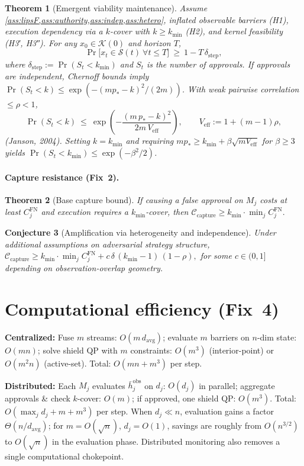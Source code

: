 \documentclass[11pt]{article}
\newtheorem{theorem}{Theorem}[section]
\newtheorem{conjecture}[theorem]{Conjecture}
\theoremstyle{definition}
\newcommand{\K}{\mathcal{K}}
\newcommand{\Sset}{\mathcal{S}}
\newcommand{\1}{\mathbf{1}}
\begin{document}
\begin{theorem}[Emergent viability maintenance]
\label{thm:emergence}
Assume \cref{ass:lipsF,ass:authority,ass:indep,ass:hetero}, inflated observable barriers (H1), execution dependency via a $k$-cover with $k\ge k_{\min}$ (H2), and kernel feasibility (H3′, H3″). For any $x_0\in \K(0)$ and horizon $T$,
\[
\Pr\big[x_t\in \Sset(t)\ \forall t\le T\big]\ \ge\ 1 - T\,\delta_{\mathrm{step}},
\]
where $\delta_{\mathrm{step}}:=\Pr(S_t<k_{\min})$ and $S_t$ is the number of approvals. If approvals are independent, Chernoff bounds imply
$\Pr(S_t<k)\le \exp(-(mp_\ast-k)^2/(2m))$. With weak pairwise correlation $\le \rho<1$,
\[
\Pr(S_t<k)\ \le\ \exp\!\left(-\frac{(m\,p_\ast-k)^2}{2m\,V_{\mathrm{eff}}}\right),\qquad
V_{\mathrm{eff}}:=1+(m-1)\rho,
\]
(Janson, 2004). Setting $k=k_{\min}$ and requiring $mp_\ast \ge k_{\min} + \beta\sqrt{mV_{\mathrm{eff}}}$ for $\beta\ge 3$ yields $\Pr(S_t<k_{\min})\le \exp(-\beta^2/2)$.
\end{theorem}

\paragraph{Capture resistance (Fix~2).}
\begin{theorem}[Base capture bound]
\label{thm:captureBase}
If causing a false approval on $M_j$ costs at least $C_j^{\mathrm{FN}}$ and execution requires a $k_{\min}$-cover, then
\(
\mathcal C_{\mathrm{capture}} \ge k_{\min}\cdot \min_j C_j^{\mathrm{FN}}.
\)
\end{theorem}

\begin{conjecture}[Amplification via heterogeneity and independence]
\label{conj:amplify}
Under additional assumptions on adversarial strategy structure,
\(
\mathcal C_{\mathrm{capture}} \ge k_{\min}\cdot \min_j C_j^{\mathrm{FN}} + c\,\delta\,(k_{\min}-1)\,(1-\rho),
\)
for some $c\in(0,1]$ depending on observation-overlap geometry.
\end{conjecture}

\section{Computational efficiency (Fix~4)}
\textbf{Centralized:}
Fuse $m$ streams: $O(m\,d_{\mathrm{avg}})$; evaluate $m$ barriers on $n$-dim state: $O(mn)$; solve shield QP with $m$ constraints: $O(m^3)$ (interior-point) or $O(m^2 n)$ (active-set).
Total: $O(mn+m^3)$ per step.

\textbf{Distributed:}
Each $M_j$ evaluates $\bar h^{\mathrm{obs}}_j$ on $d_j$: $O(d_j)$ in parallel; aggregate approvals \& check $k$-cover: $O(m)$; if approved, one shield QP: $O(m^3)$.
Total: $O(\max_j d_j + m + m^3)$ per step.
When $d_j\ll n$, evaluation gains a factor $\Theta(n/d_{\mathrm{avg}})$; for $m=O(\sqrt n)$, $d_j=O(1)$, savings are roughly from $O(n^{3/2})$ to $O(\sqrt n)$ in the evaluation phase. Distributed monitoring also removes a single computational chokepoint.
\end{document}
